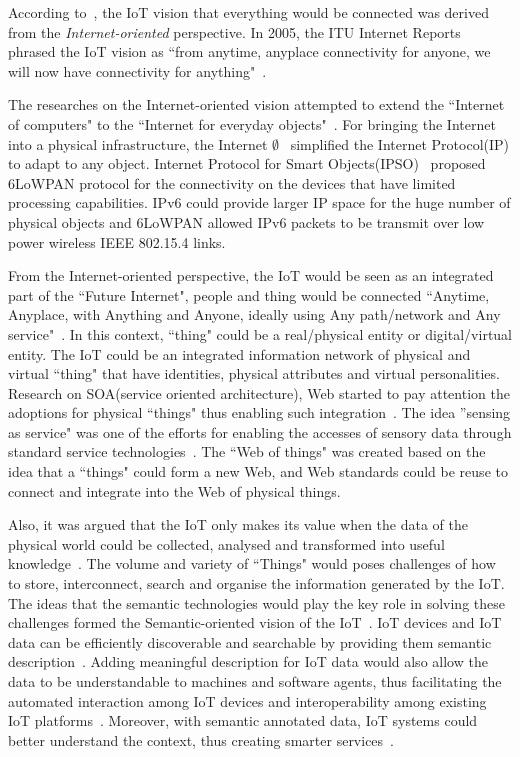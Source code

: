 According to~\cite{Atzori:2010}, the IoT vision that everything would be connected was derived from the \textit{Internet-oriented} perspective.
In 2005, the ITU Internet Reports phrased the IoT vision as ``from anytime, anyplace connectivity for anyone, we will now have connectivity for anything"~\citep{ITU:2005}.

The researches on the Internet-oriented vision attempted to extend the ``Internet of computers" to the ``Internet for everyday objects"~\citep{Mattern:2010}.
For bringing the Internet into a physical infrastructure, the Internet $\emptyset$~\citep{Gershenfeld:2006} simplified the Internet Protocol(IP) to adapt to any object.
Internet Protocol for Smart Objects(IPSO)~\citep{Dunkels:2008} proposed 6LoWPAN protocol for the connectivity on the devices that have limited processing capabilities.
IPv6 could provide larger IP space for the huge number of physical objects and 6LoWPAN allowed IPv6 packets to be transmit over low power wireless IEEE 802.15.4 links.

From the Internet-oriented perspective, the IoT would be seen as an integrated part of the ``Future Internet", people and thing would be connected ``Anytime, Anyplace, with Anything and Anyone, ideally using Any path/network and Any service"~\citep{Sundmaeker:2010}.
In this context, ``thing" could be a real/physical entity or digital/virtual entity.
The IoT could be an integrated information network of physical and virtual ``thing" that have identities, physical attributes and virtual personalities.  
Research on SOA(service oriented architecture), Web started to pay attention the adoptions for physical ``things" thus enabling such integration~\citep{De:2011, De:2012,Guinard:2009}. 
The idea ''sensing as service" was one of the efforts for enabling the accesses of sensory data through standard service technologies~\citep{Perera:2014a}. 
The ``Web of things" was created based on the idea that a ``things" could form a new Web, and Web standards could be reuse to connect and integrate into the Web of physical things.

Also, it was argued that the IoT only makes its value when the data of the physical world could be collected, analysed and transformed into useful knowledge~\citep{Vermesan:2011}.
The volume and variety of ``Things" would poses challenges of how to store, interconnect, search and organise the information generated by the IoT. 
The ideas that the semantic technologies would play the key role in solving these challenges formed the Semantic-oriented vision of the IoT~\citep{Atzori:2014,Barnaghi:2012}.
IoT devices and IoT data can be efficiently discoverable and searchable by providing them semantic description~\citep{Ioan:2009, Chun:2015,Serena:2017}. 
Adding meaningful description for IoT data would also allow the data to be understandable to machines and software agents, thus facilitating the automated interaction among IoT devices and interoperability among existing IoT platforms~\citep{IERC:2015, Ganzha:2017}. 
Moreover, with semantic annotated data, IoT systems could better understand the context, thus creating smarter services~\citep{Perera:2014a}. 






